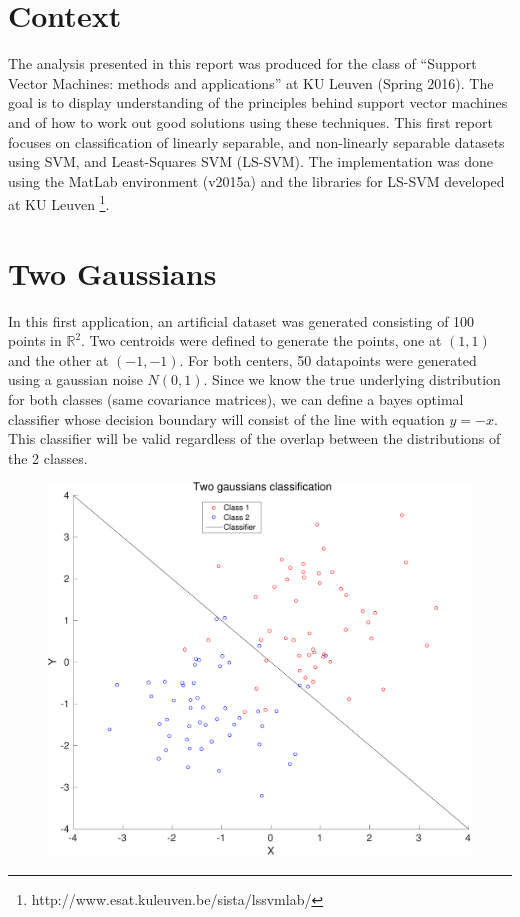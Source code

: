 \documentclass[11pt, a4paper]{article}
\begin{document}

\tableofcontents
\newpage

\section*{Context}

The analysis presented in this report was produced for the class of
``Support Vector Machines: methods and applications'' at KU Leuven
(Spring 2016). The goal is to display understanding of the principles
behind support vector machines and of how to work out good solutions
using these techniques. This first report focuses on classification of
linearly separable, and non-linearly separable datasets using SVM, and
Least-Squares SVM (LS-SVM). The implementation was done using the
MatLab environment (v2015a) and the libraries for LS-SVM developed at
KU Leuven \footnote{http://www.esat.kuleuven.be/sista/lssvmlab/}.

\section{Two Gaussians}

In this first application, an artificial dataset was generated
consisting of 100 points in $\mathbb{R}^2$. Two centroids were defined
to generate the points, one at $(1,1)$ and the other at $(-1,-1)$. For
both centers, 50 datapoints were generated using a gaussian noise
$N(0,1)$. Since we know the true underlying distribution for both
classes (same covariance matrices), we can define a bayes optimal
classifier whose decision boundary will consist of the line with
equation $y=-x$. This classifier will be valid regardless of the
overlap between the distributions of the 2 classes.

\begin{figure}[H]
    \centering
    \includegraphics[scale=.40]{two_gaussians.pdf}
    \label{fig:two_gaussians}
\end{figure}
\end{document}
